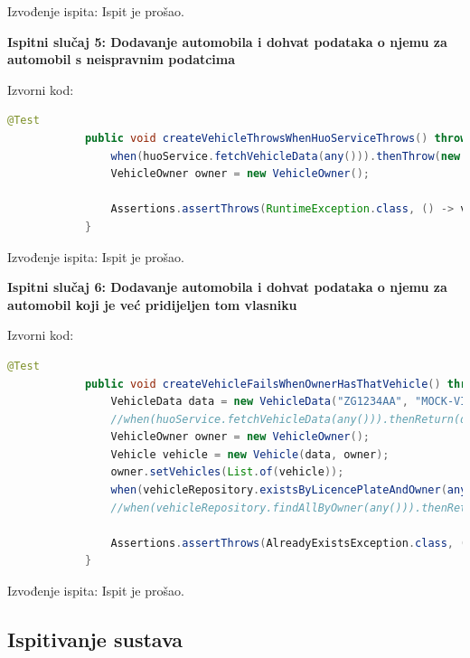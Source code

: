 			\noindent Izvođenje ispita: Ispit je prošao.
			
			\hfill\break
			\noindent\textbf{Ispitni slučaj 5: Dodavanje automobila i dohvat podataka o njemu za automobil s neispravnim podatcima}
			
			\noindent Izvorni kod:
			
			\begin{lstlisting}[language=Java]
			@Test
			public void createVehicleThrowsWhenHuoServiceThrows() throws HuoServiceException {
				when(huoService.fetchVehicleData(any())).thenThrow(new HuoServiceException());
				VehicleOwner owner = new VehicleOwner();
				
				Assertions.assertThrows(RuntimeException.class, () -> vehicleService.create("ZG1234AA", owner));
			}
			\end{lstlisting}
			
			\noindent Izvođenje ispita: Ispit je prošao.
			
			\hfill\break
			\noindent\textbf{Ispitni slučaj 6: Dodavanje automobila i dohvat podataka o njemu za automobil koji je već pridijeljen tom vlasniku}
			
			\noindent Izvorni kod:
			
			\begin{lstlisting}[language=Java]
			@Test
			public void createVehicleFailsWhenOwnerHasThatVehicle() throws HuoServiceException {
				VehicleData data = new VehicleData("ZG1234AA", "MOCK-VIN", "Audi A1");
				//when(huoService.fetchVehicleData(any())).thenReturn(data);
				VehicleOwner owner = new VehicleOwner();
				Vehicle vehicle = new Vehicle(data, owner);
				owner.setVehicles(List.of(vehicle));
				when(vehicleRepository.existsByLicencePlateAndOwner(any(), any())).thenReturn(true);
				//when(vehicleRepository.findAllByOwner(any())).thenReturn(List.of(vehicle));
				
				Assertions.assertThrows(AlreadyExistsException.class, () -> vehicleService.create("ZG1234AA", owner));
			}
			\end{lstlisting}
			
			\noindent Izvođenje ispita: Ispit je prošao.
			
			\subsection{Ispitivanje sustava}
			
			 
